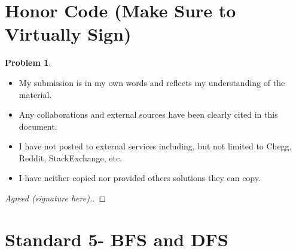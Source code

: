\documentclass[11pt]{article}
\theoremstyle{definition}
\theoremstyle{definition}
\newtheorem{required}{Problem}
\theoremstyle{definition}
\begin{document}
\section{Honor Code (Make Sure to Virtually Sign)} \label{HonorCode}

\begin{required}
\begin{itemize}
\item My submission is in my own words and reflects my understanding of the material.
\item Any collaborations and external sources have been clearly cited in this document.
\item I have not posted to external services including, but not limited to Chegg, Reddit, StackExchange, etc.
\item I have neither copied nor provided others solutions they can copy.
\end{itemize}

\end{required}

\begin{proof}[Agreed (signature here).]
\end{proof}


\newpage
\section{Standard 5- BFS and DFS}
\end{document}
